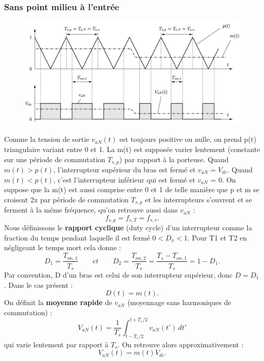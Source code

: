 	 	\subsubsection{Sans point milieu à l'entrée}
	 		\begin{figure}
			\vspace{-5mm}
			\includegraphics[scale=0.2]{ch4/6}
			\end{figure}
			Comme la tension de sortie $v_{aN}(t)$ est toujours positive ou nulle, on prend p(t) triangulaire variant entre 0 et 1. La m(t) est supposée varier lentement (constante sur une période de commutation $T_{s,p}$) par rapport à la porteuse. Quand $m(t) > p(t)$, l'interrupteur supérieur du bras est fermé et $v_{aN} = V_{dc}$. Quand $m(t) < p(t)$, c'est l'interrupteur inférieur qui est fermé et $v_{aN}$ = 0. On suppose que la m(t) est aussi comprise entre 0 et 1 de telle manière que p et m se croisent 2x par période de commutation $T_{s,p}$ et les interrupteurs s'ouvrent et se ferment à la même fréquence, qu'on retrouve aussi dans $v_{aN}$ : 
			\begin{equation}
				f_{s,p} = f_{s,T} = f_{s,v}. 
			\end{equation}
			Nous définissons le \textbf{rapport cyclique} (duty cycle) d'un interrupteur comme la fraction du temps pendant laquelle il est fermé $0<D_x<1$. Pour T1 et T2 en négligeant le temps mort cela donne : 
			\begin{equation}
				D_1 = \frac{T_{on,1}}{T_s} \qquad et \qquad D_2 = \frac{T_{on,2}}{T_s} = \frac{T_s - T_{on,1}}{T_s} = 1 - D_1.
			\end{equation}
			Par convention, D d'un bras est celui de son interrupteur supérieur, donc $D = D_1$. Dans le cas présent :
			\begin{equation}
				D(t) = m(t). 
			\end{equation}
			On définit la \textbf{moyenne rapide} de $v_{aN}$ (moyennage sans harmoniques de commutation) : 
			\begin{equation}
				V_{aN}(t) = \frac{1}{T_s}\int _{t-T_s/2}^{t+T_s/2} v_{aN}(t') \, dt'
			\end{equation}
			qui varie lentement par rapport à $T_s$. On retrouve alors  approximativement : 
			\begin{equation}
				V_{aN}(t) = m(t) V_{dc}. 
			\end{equation}
			
